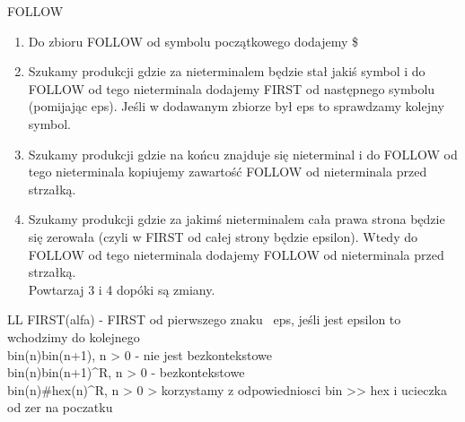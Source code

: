 FOLLOW
\begin{enumerate}
  \item Do zbioru FOLLOW od symbolu początkowego dodajemy \$
  \item  Szukamy produkcji gdzie za nieterminalem będzie stał jakiś symbol i do FOLLOW od tego nieterminala dodajemy FIRST od następnego symbolu (pomijając eps). Jeśli w dodawanym zbiorze był eps to sprawdzamy kolejny symbol.
  \item Szukamy produkcji gdzie na końcu znajduje się nieterminal i do FOLLOW od tego nieterminala kopiujemy zawartość FOLLOW od nieterminala przed strzałką. 
  \item Szukamy produkcji gdzie za jakimś nieterminalem cała prawa strona będzie się zerowała (czyli w FIRST od całej strony będzie epsilon). Wtedy do FOLLOW od tego nieterminala dodajemy FOLLOW od nieterminala przed strzałką. \\
  Powtarzaj 3 i 4 dopóki są zmiany.
\end{enumerate}

LL
FIRST(alfa) - FIRST od pierwszego znaku \ {eps}, jeśli jest epsilon to wchodzimy do kolejnego
\\
bin(n)bin(n+1), n > 0 - nie jest bezkontekstowe \\
bin(n)bin(n+1)^R, n > 0 - bezkontekstowe \\
bin(n)#hex(n)^R, n > 0 > korzystamy z odpowiedniosci bin >> hex i ucieczka od zer na poczatku \\
